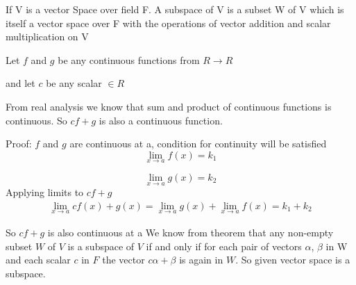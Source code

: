 
If V is a vector Space over field F. A subspace of V is a subset W of V which is itself a vector space over F with the operations of vector addition and scalar multiplication on V








Let $f$ and $g$ be any continuous functions from  $ R\rightarrow R$   



and let $c$ be any scalar
 $\in R$

From real analysis we know that sum and product of continuous functions is continuous. So $cf+g$ is also a continuous function. 

Proof:
$f$ and $g$ are continuous at a, condition for continuity will be satisfied
\begin{equation}
    \lim_{x \to a} f(x)=k_1
\end{equation}

\begin{equation}
\lim_{x \to a} g(x)=k_2    
\end{equation}
Applying limits to $cf+g$
\begin{align}
\lim_{x \to a} cf(x)+g(x)=\lim_{x \to a} g(x)+\lim_{x \to a} f(x)=k_1+k_2
\end{align}

So $cf+g$ is also continuous at a
We know from theorem that any non-empty subset $W$ of $V$ is a subspace of $V$ if and only if for each pair of vectors $\alpha$, $\beta$ in W and each scalar $c$ in $F$ the vector $c\alpha+\beta$ is again in $W$. 
So given vector space is a subspace.
